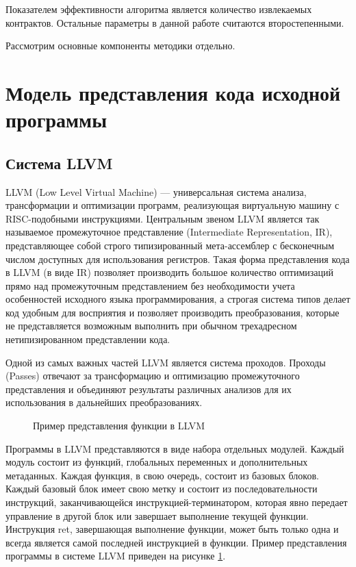Показателем эффективности алгоритма является количество извлекаемых контрактов.  Остальные параметры в данной работе считаются второстепенными.

Рассмотрим основные компоненты методики отдельно.

\section{Модель представления кода исходной программы}

\subsection{Система LLVM}
LLVM (Low Level Virtual Machine) --- универсальная система анализа, трансформации и оптимизации программ, реализующая виртуальную машину с RISC-подобными инструкциями. Центральным звеном LLVM является так называемое промежуточное представление (Intermediate Representation, IR), представляющее собой строго типизированный мета-ассемблер с бесконечным числом доступных для использования регистров.  Такая форма представления кода в LLVM (в виде IR) позволяет производить большое количество оптимизаций прямо над промежуточным представлением без необходимости учета особенностей исходного языка программирования, а строгая система типов делает код удобным для восприятия и позволяет производить преобразования, которые не представляется возможным выполнить при обычном трехадресном нетипизированном представлении кода.

Одной из самых важных частей LLVM является система проходов\cite{llvmpass}. Проходы (Passes) отвечают за трансформацию и оптимизацию промежуточного представления и объединяют результаты различных анализов для их использования в дальнейших преобразованиях.
\begin{figure}[h!]
\caption{Пример представления функции в LLVM}
\label{image:llvmIR}
\end{figure}

Программы в LLVM представляются в виде набора отдельных модулей. Каждый модуль состоит из функций, глобальных переменных и дополнительных метаданных. Каждая функция, в свою очередь, состоит из базовых блоков. Каждый базовый блок имеет свою метку и состоит из последовательности инструкций, заканчивающейся инструкцией-терминатором, которая явно передает управление в другой блок или завершает выполнение текущей функции. Инструкция ret, завершающая выполнение функции, может быть только одна и всегда является самой последней инструкцией в функции. Пример представления программы в системе LLVM приведен на рисунке \ref{image:llvmIR}.
	
